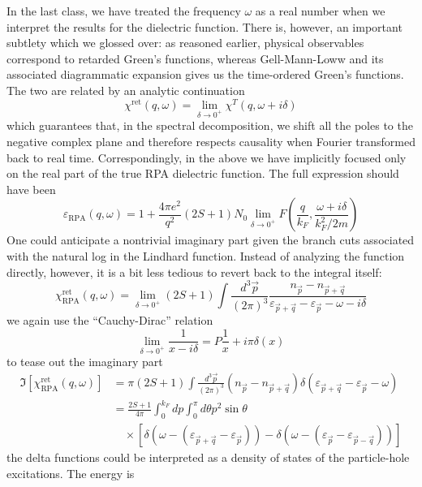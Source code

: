 In the last class, we have treated the frequency $\omega$ as a real number when we interpret the results for the dielectric function. There is, however, an important subtlety which we glossed over: as reasoned earlier, physical observables correspond to retarded Green's functions, whereas Gell-Mann-Loww and its associated diagrammatic expansion gives us the time-ordered Green's functions. The two are related by an analytic continuation
\[ \chi ^{\mathrm{ret}}\left( q,\omega \right) =\lim_{\delta \rightarrow 0^+} \chi ^T\left( q,\omega +i\delta \right) \]
which guarantees that, in the spectral decomposition, we shift all the poles to the negative complex plane and therefore respects causality when Fourier transformed back to real time. Correspondingly, in the above we have implicitly focused only on the real part of the true RPA dielectric function. The full expression should have been
\[ \varepsilon _{\mathrm{RPA}}\left( q,\omega \right) =1+\frac{4\pi e^2}{q^2}\left( 2S+1 \right) N_0\lim_{\delta \rightarrow 0^+} F\left( \frac{q}{k_F},\frac{\omega +i\delta}{k_{F}^{2}/2m} \right) \]
One could anticipate a nontrivial imaginary part given the branch cuts associated with the natural log in the Lindhard function. Instead of analyzing the function directly, however, it is a bit less tedious to revert back to the integral itself:
\[  \chi _{\mathrm{RPA}}^{\mathrm{ret}}\left( q,\omega \right) =\lim_{\delta \rightarrow 0^+} \left( 2S+1 \right) \int{\frac{d^3\vec{p}}{\left( 2\pi \right) ^3}\frac{n_{\vec{p}}-n_{\vec{p}+\vec{q}}}{\varepsilon _{\vec{p}+\vec{q}}-\varepsilon _{\vec{p}}-\omega -i\delta}}\]
we again use the ``Cauchy-Dirac'' relation
\[ \lim_{\delta \rightarrow 0^+} \frac{1}{x-i\delta}=P\frac{1}{x}+i\pi \delta \left( x \right) \]
to tease out the imaginary part
\begin{align*}
    \Im \left[ \chi _{\mathrm{RPA}}^{\mathrm{ret}}\left( q,\omega \right) \right] &=\pi \left( 2S+1 \right) \int{\frac{d^3\vec{p}}{\left( 2\pi \right) ^3}\left( n_{\vec{p}}-n_{\vec{p}+\vec{q}} \right) \delta \left( \varepsilon _{\vec{p}+\vec{q}}-\varepsilon _{\vec{p}}-\omega \right)}\\
    &=\frac{2S+1}{4\pi}\int_0^{k_F}{dp\int_0^{\pi}{d\theta p^2\sin \theta}}\\
    &\quad \times \left[ \delta \left( \omega -\left( \varepsilon _{\vec{p}+\vec{q}}-\varepsilon _{\vec{p}} \right) \right) -\delta \left( \omega -\left( \varepsilon _{\vec{p}}-\varepsilon _{\vec{p}-\vec{q}} \right) \right) \right]
\end{align*}
the delta functions could be interpreted as a density of states of the particle-hole excitations. The energy is
